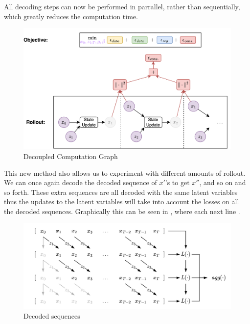 All decoding steps can now be performed in parrallel, rather than sequentially, which greatly reduces the computation time. 

\begin{figure}[!ht]
    \centering
    \includegraphics[width=1\textwidth]{Figures/humor/improvement/computation_graph_dimm.png}
    \caption{Decoupled Computation Graph}
    \label{fig:dimm_rollout_graph}
\end{figure}

This new method also allows us to experiment with different amounts of rollout. We can once again decode the decoded sequence of $x'$'s to get $x''$, and so on and so forth. These extra sequences are all decoded with the same latent variables thus the updates to the latent variables will take into account the losses on all the decoded sequences. Graphically this can be seen in , where each next line .

\begin{figure}[!ht]
    \centering
    \includegraphics[width=1\textwidth]{Figures/humor/improvement/Rollout_overlap.png}
    \caption{Decoded sequences}
    \label{fig:dimm_decoded_sequences}
\end{figure}

